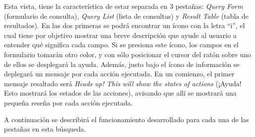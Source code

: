 Esta vista, tiene la característica de estar separada en 3 pestañas:
\emph{Query Form} (formulario de consulta), \emph{Query List} (lista
de consultas) y \emph{Result Table} (tabla de resultados). En las dos
primeras se podrá encontrar un ícono con la letra ``i'', el cual tiene
por objetivo mostrar una breve descripción que ayude al usuario a
entender qué significa cada campo. Si se presiona este ícono, los
campos en el formulario tomarán otro color, y con sólo posicionar el
cursor del ratón sobre uno de ellos se desplegará la ayuda. Además,
justo bajo el ícono de información se deplegará un mensaje por cada
acción ejecutada. En un comienzo, el primer mensaje resaltado será
\emph{Heads up! This will show the states of actions} (¡Ayuda! Esto
mostrará los estados de las acciones), avisando que allí se mostrará
una pequeña reseña por cada acción ejecutada.

A continuación se describirá el funcionamiento desarrollado para cada
una de las pestañas en esta búsqueda.

